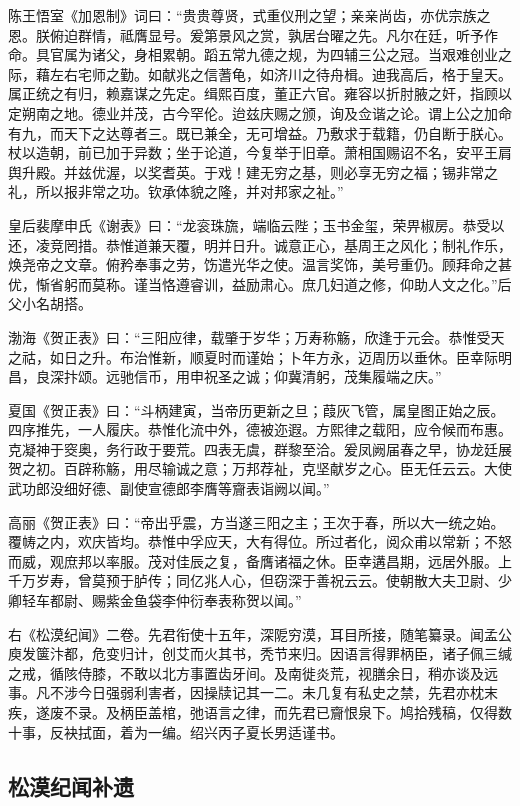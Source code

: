 \documentclass[]{article}
\begin{document}
陈王悟室《加恩制》词曰：``贵贵尊贤，式重仪刑之望；亲亲尚齿，亦优宗族之恩。朕俯迫群情，祗膺显号。爰第景风之赏，孰居台曜之先。凡尔在廷，听予作命。具官属为诸父，身相累朝。蹈五常九德之规，为四辅三公之冠。当艰难创业之际，藉左右宅师之勤。如献兆之信蓍龟，如济川之待舟楫。迪我高后，格于皇天。属正统之有归，赖嘉谋之先定。缉熙百度，董正六官。雍容以折肘腋之奸，指顾以定朔南之地。德业并茂，古今罕伦。迨兹庆赐之颁，询及佥谐之论。谓上公之加命有九，而天下之达尊者三。既已兼全，无可增益。乃敷求于载籍，仍自断于朕心。杖以造朝，前已加于异数；坐于论道，今复举于旧章。萧相国赐诏不名，安平王肩舆升殿。并兹优渥，以奖耆英。于戏！建无穷之基，则必享无穷之福；锡非常之礼，所以报非常之功。钦承体貌之隆，并对邦家之祉。''

皇后裴摩申氏《谢表》曰：``龙衮珠旒，端临云陛；玉书金玺，荣畀椒房。恭受以还，凌竞罔措。恭惟道兼天覆，明并日升。诚意正心，基周王之风化；制礼作乐，焕尧帝之文章。俯矜奉事之劳，饬遣光华之使。温言奖饰，美号重仍。顾拜命之甚优，惭省躬而莫称。谨当恪遵睿训，益励肃心。庶几妇道之修，仰助人文之化。''后父小名胡搭。

渤海《贺正表》曰：``三阳应律，载肇于岁华；万寿称觞，欣逢于元会。恭惟受天之祜，如日之升。布治惟新，顺夏时而谨始；卜年方永，迈周历以垂休。臣幸际明昌，良深抃颂。远驰信币，用申祝圣之诚；仰冀清躬，茂集履端之庆。''

夏国《贺正表》曰：``斗柄建寅，当帝历更新之旦；葭灰飞管，属皇图正始之辰。四序推先，一人履庆。恭惟化流中外，德被迩遐。方熙律之载阳，应令候而布惠。克凝神于窔奥，务行政于要荒。四表无虞，群黎至洽。爰凤阙届春之早，协龙廷展贺之初。百辟称觞，用尽输诚之意；万邦荐祉，克坚献岁之心。臣无任云云。大使武功郎没细好德、副使宣德郎李膺等齎表诣阙以闻。''

高丽《贺正表》曰：``帝出乎震，方当遂三阳之主；王次于春，所以大一统之始。覆帱之内，欢庆皆均。恭惟中孚应天，大有得位。所过者化，阅众甫以常新；不怒而威，观庶邦以率服。茂对佳辰之复，备膺诸福之休。臣幸遘昌期，远居外服。上千万岁寿，曾莫预于胪传；同亿兆人心，但窃深于善祝云云。使朝散大夫卫尉、少卿轻车都尉、赐紫金鱼袋李仲衍奉表称贺以闻。''

右《松漠纪闻》二卷。先君衔使十五年，深阸穷漠，耳目所接，随笔纂录。闻孟公庾发箧汴都，危变归计，创艾而火其书，秃节来归。因语言得罪柄臣，诸子佩三缄之戒，循陔侍膝，不敢以北方事置齿牙间。及南徙炎荒，视膳余日，稍亦谈及远事。凡不涉今日强弱利害者，因操牍记其一二。未几复有私史之禁，先君亦枕末疾，遂废不录。及柄臣盖棺，弛语言之律，而先君已齎恨泉下。鸠拾残稿，仅得数十事，反袂拭面，着为一编。绍兴丙子夏长男适谨书。

\hypertarget{header-n24}{%
\subsection{松漠纪闻补遗}\label{header-n24}}
\end{document}
